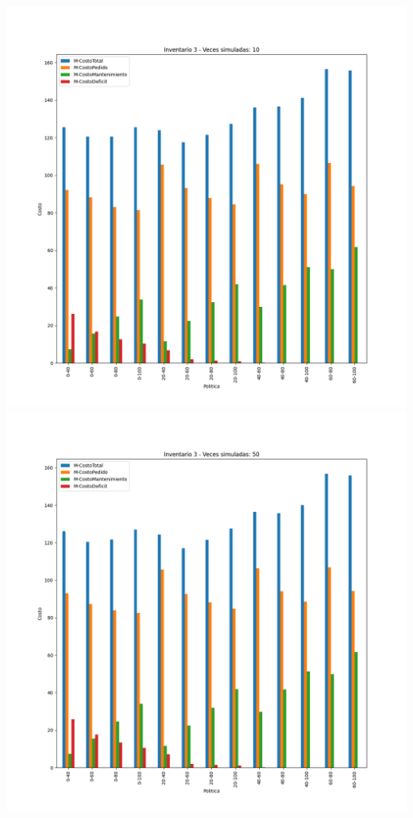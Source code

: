 \documentclass[11pt,a4paper]{report}
\begin{document}
\begin{center}
	\includegraphics[width=0.45\textheight]{img/Cap-2/inventario-3/inventario3-10veces.png}
	\includegraphics[width=0.45\textheight]{img/Cap-2/inventario-3/inventario3-50veces.png}

\end{center}
\end{document}
